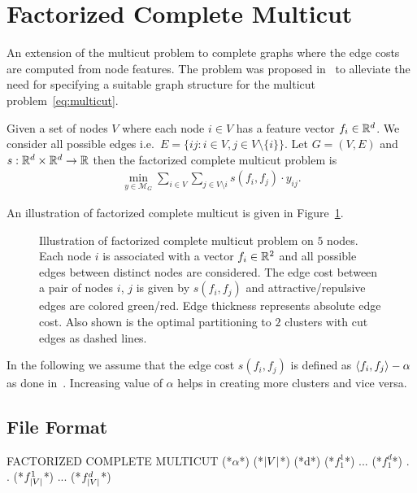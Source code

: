 \section{Factorized Complete Multicut}
\label{sec:complete_multicut}
An extension of the multicut problem to complete graphs where the edge costs are computed from node features. The problem was proposed in~\cite{aabbas23_clusterfug} to alleviate the need for specifying a suitable graph structure for the multicut problem~\eqref{eq:multicut}. 
\begin{definition}
    Given a set of nodes $V$ where each node $i \in V$ has a feature vector $f_i \in \mathbb{R}^d$. We consider all possible edges i.e.\ $E = \{ij : i \in V, j \in V\setminus \{i\} \}$. 
    Let $G = (V, E)$ and $s: \mathbb{R}^d \times \mathbb{R}^d \rightarrow \mathbb{R}$ then the factorized complete multicut problem is
    \begin{equation}
        \label{eq:factorized_complete_multicut}
        \begin{array}{rl}
            \min_{y \in \mathcal{M}_G} \sum\limits_{i \in V} \sum\limits_{j \in V \setminus i} s(f_i, f_j) \cdot y_{ij}.
        \end{array}
    \end{equation}
\end{definition}

An illustration of factorized complete multicut is given in Figure~\ref{fig:factorized-complete-multicut}.

\begin{figure}[H]
    \begin{center}
    \scalebox{1.5}{}
    \end{center}
    \caption{Illustration of factorized complete multicut problem on $5$ nodes. Each node $i$ is associated with a vector $f_i \in \mathbb{R}^2$ and all possible edges between distinct nodes are considered. The edge cost between a pair of nodes $i$, $j$ is given by $s(f_i, f_j)$ and attractive/repulsive edges are colored green/red. Edge thickness represents absolute edge cost. Also shown is the optimal partitioning to $2$ clusters with cut edges as dashed lines.}    
    \label{fig:factorized-complete-multicut}
\end{figure}
In the following we assume that the edge cost $s(f_i, f_j)$ is defined as $\langle f_i, f_j \rangle - \alpha$ as done in~\cite{aabbas23_clusterfug}. Increasing value of $\alpha$ helps in creating more clusters and vice versa.
\subsection{File Format}
\begin{fileformat}
FACTORIZED COMPLETE MULTICUT
(*$\alpha$*)
(*$\lvert V\rvert$*) (*d*)
(*$f_1^1$*) ... (*$f_1^d$*)
.
.
(*$f_{\lvert V\rvert}^1$*) ... (*$f_{\lvert V\rvert}^d$*)
\end{fileformat}
